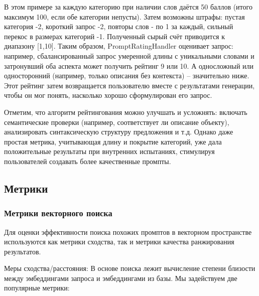 В этом примере за каждую категорию при наличии слов даётся 50 баллов (итого максимум 100, если обе категории непусты). Затем возможны штрафы: пустая категория -2, короткий запрос -2, повторы слов - по 1 за каждый, сильный перекос в размерах категорий -1. Полученный сырый счёт приводится к диапазону [1,10]. Таким образом, PromptRatingHandler оценивает запрос: например, сбалансированный запрос умеренной длины с уникальными словами и затронувший оба аспекта может получить рейтинг 9 или 10. А односложный или односторонний (например, только описания без контекста) – значительно ниже. Этот рейтинг затем возвращается пользователю вместе с результатами генерации, чтобы он мог понять, насколько хорошо сформулирован его запрос.

Отметим, что алгоритм рейтингования можно улучшать и усложнять: включать семантические проверки (например, соответствует ли описание объекту), анализировать синтаксическую структуру предложения и т.д. Однако даже простая метрика, учитывающая длину и покрытие категорий, уже дала положительные результаты при внутренних испытаниях, стимулируя пользователей создавать более качественные промпты.

\subsection{Метрики}

\subsubsection{Метрики векторного поиска}

Для оценки эффективности поиска похожих промптов в векторном пространстве используются как метрики сходства, так и метрики качества ранжирования результатов.

Меры сходства/расстояния: В основе поиска лежит вычисление степени близости между эмбеддингами запроса и эмбеддингами из базы. Мы задействуем две популярные метрики:

